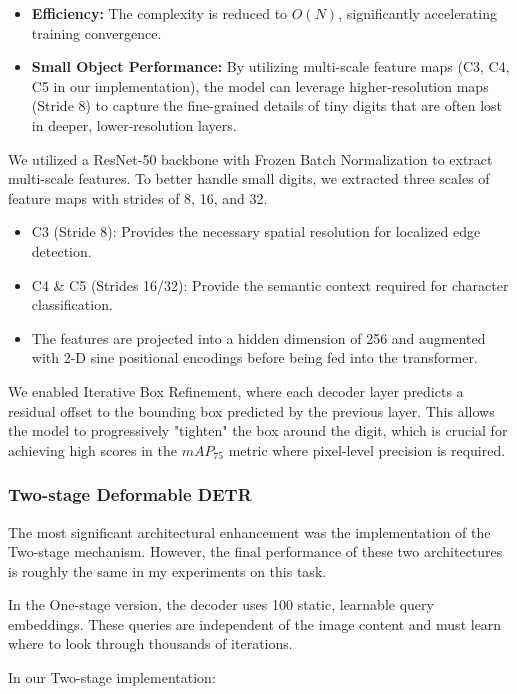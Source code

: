 \documentclass[a4paper]{article} %
\begin{document}
\begin{itemize}
    \item \textbf{Efficiency:} The complexity is reduced to $O(N)$, significantly accelerating training convergence.
    \item \textbf{Small Object Performance:} By utilizing multi-scale feature maps (C3, C4, C5 in our implementation), the model can leverage higher-resolution maps (Stride 8) to capture the fine-grained details of tiny digits that are often lost in deeper, lower-resolution layers.
\end{itemize}

We utilized a ResNet-50 backbone with Frozen Batch Normalization to extract multi-scale features. To better handle small digits, we extracted three scales of feature maps with strides of 8, 16, and 32.

\begin{itemize}
    \item C3 (Stride 8): Provides the necessary spatial resolution for localized edge detection.
    \item C4 \& C5 (Strides 16/32): Provide the semantic context required for character classification.
    \item The features are projected into a hidden dimension of 256 and augmented with 2-D sine positional encodings before being fed into the transformer.
\end{itemize}

We enabled Iterative Box Refinement, where each decoder layer predicts a residual offset to the bounding box predicted by the previous layer. This allows the model to progressively "tighten" the box around the digit, which is crucial for achieving high scores in the $mAP_{75}$ metric where pixel-level precision is required.

\subsubsection{Two-stage Deformable DETR}

The most significant architectural enhancement was the implementation of the Two-stage mechanism. However, the final performance of these two architectures is roughly the same in my experiments on this task.

In the One-stage version, the decoder uses 100 static, learnable query embeddings. These queries are independent of the image content and must learn where to look through thousands of iterations. 

In our Two-stage implementation:
\end{document}
